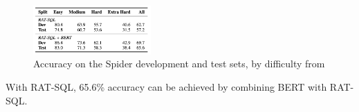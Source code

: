 \begin{figure}[htb]
    \centering
    \includegraphics[width=0.4\textwidth]{pics/RAT-SQL/Accuracy2.png}
    \caption{Accuracy on the Spider development and test sets, by difficulty from \cite{wang_rat-sql_2021}}
    \label{fig:RAT-SQL-Accuracy2}
\end{figure}

With RAT-SQL, 65.6\% accuracy can be achieved by combining BERT with RAT-SQL.
